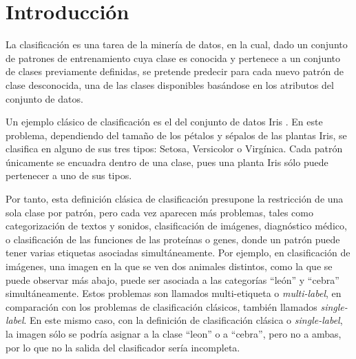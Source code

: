 


\chapter{Introducción}
\label{cha:Introduccion}



La clasificación es una tarea de la minería de datos, en la cual, dado un conjunto de patrones de entrenamiento cuya clase es conocida y pertenece a un conjunto de clases previamente definidas, se pretende predecir para cada nuevo patrón de clase desconocida, una de las clases disponibles basándose en los atributos del conjunto de datos.

Un ejemplo clásico de clasificación es el del conjunto de datos Iris \cite{Iris}. En este problema, dependiendo del tamaño de los pétalos y sépalos de las plantas Iris, se clasifica en alguno de sus tres tipos: Setosa, Versicolor o Virgínica. Cada patrón únicamente se encuadra dentro de una clase, pues una planta Iris sólo puede pertenecer a uno de sus tipos.

Por tanto, esta definición clásica de clasificación presupone la restricción de una sola clase por patrón, pero cada vez aparecen más problemas, tales como categorización de textos y sonidos, clasificación de imágenes, diagnóstico médico, o clasificación de las funciones de las proteínas o genes, donde un patrón puede tener varias etiquetas asociadas simultáneamente. Por ejemplo, en clasificación de imágenes, una imagen en la que se ven dos animales distintos, como la que se puede observar más abajo, puede ser asociada a las categorías ``león'' y ``cebra'' simultáneamente. Estos problemas son llamados multi-etiqueta o \textit{multi-label}, en comparación con los problemas de clasificación clásicos, también llamados \textit{single-label}. En este mismo caso, con la definición de clasificación clásica o \textit{single-label}, la imagen sólo se podría asignar a la clase ``leon'' o a ``cebra'', pero no a ambas, por lo que no la salida del clasificador sería incompleta.


